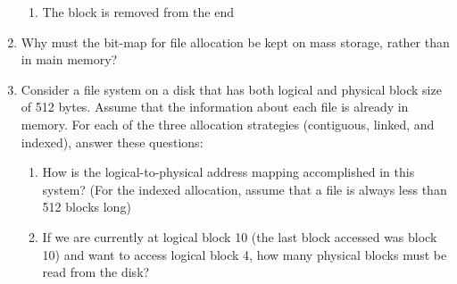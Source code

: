 \documentclass{article}
\begin{document}
\begin{enumerate}
\begin{enumerate}
			\item The block is removed from the end
		\end{enumerate}
		\item Why must the bit-map for file allocation be kept on mass storage, rather than in main memory?
		\item Consider a file system on a disk that has both logical and physical block size of 512 bytes. Assume that the information about each file is already in memory. For each of the three allocation strategies (contiguous, linked, and indexed), answer these questions:
		\begin{enumerate}
			\item How is the logical-to-physical address mapping accomplished in this system? (For the indexed allocation, assume that a file is always less than 512 blocks long)
			\item If we are currently at logical block 10 (the last block accessed was block 10) and want to access logical block 4, how many physical blocks must be read from the disk?
		\end{enumerate}
		
	\end{enumerate}
\end{document}
